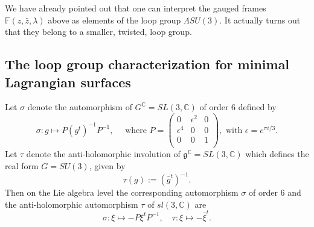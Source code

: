 \documentclass[a4paper,11pt]{amsart}
\theoremstyle{definition}
\numberwithin{equation}{section}
\newcommand{\F}{\mathbb{F}}
\begin{document}
We have already pointed out that one can interpret the gauged frames $\F(z, \bar{z}, \lambda)$ above as elements of the loop group $\Lambda SU(3)$. It actually turns out that they belong to a smaller, twisted, loop group.

\subsection{The loop group characterization for minimal Lagrangian surfaces}


 Let $\sigma$ denote the  automorphism of $G^{\mathbb{C}}=SL(3,\mathbb{C})$ of order $6$ defined by
\begin{equation} \label{sigmaandtaugroup}
\sigma: g\mapsto P (g^t)^{-1} P^{-1}, \quad \text{ where } 
P=\left(
  \begin{array}{ccc}
    0 & \epsilon^2 & 0 \\
    \epsilon^4 & 0 & 0 \\
    0 &0 & 1\\
  \end{array}
\right), \text{ with } \epsilon=e^{\pi i/3}.
\end{equation}
Let $\tau$ denote the anti-holomorphic involution of $\mathfrak{g}^{\mathbb{C}}=SL(3,\mathbb{C})$ which defines  the real form $G=SU(3)$, 
given by $$\tau(g):=(\bar{g}^t)^{-1}.$$
Then on the Lie algebra level the corresponding automorphism $\sigma$ of order $6$ and 
the anti-holomorphic automorphism $\tau$
of $sl(3,\mathbb{C})$ are
\begin{equation} \label{sigma and tau Lie}
\sigma: \xi \mapsto -P\xi^t P^{-1}, \quad \tau: \xi \mapsto -\bar{\xi}^t.
\end{equation}
\end{document}
